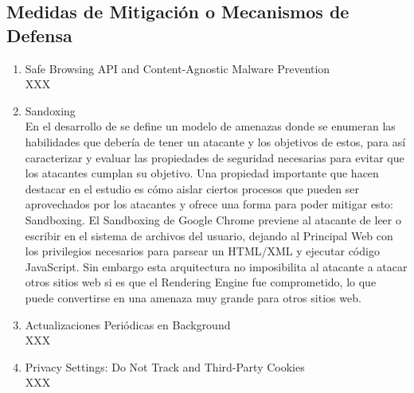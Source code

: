 \subsection{Medidas de Mitigación o Mecanismos de Defensa}
\label{chap3:mitig}

    \begin{enumerate}
        \item Safe Browsing API and Content-Agnostic Malware Prevention
        \\XXX 

        \item Sandoxing
        \\En el desarrollo de \cite{barth2008security} se define un modelo de amenazas donde se enumeran las habilidades que debería de tener un atacante y los objetivos de estos, para así caracterizar y evaluar las propiedades de seguridad necesarias para evitar que los atacantes cumplan su objetivo. Una propiedad importante que hacen destacar en el estudio es cómo aislar ciertos procesos que pueden ser aprovechados por los atacantes y ofrece una forma para poder mitigar esto: Sandboxing. El Sandboxing de Google Chrome previene al atacante de leer o escribir en el sistema de archivos del usuario, dejando al Principal Web con los privilegios necesarios para parsear un HTML/XML y ejecutar código JavaScript. Sin embargo esta arquitectura no imposibilita al atacante a atacar otros sitios web si es que el Rendering Engine fue comprometido, lo que puede convertirse en una amenaza muy grande para otros sitios web.

        \item Actualizaciones Periódicas en Background
        \\XXX

        \item Privacy Settings: Do Not Track and Third-Party Cookies
        \\XXX



\end{enumerate}
